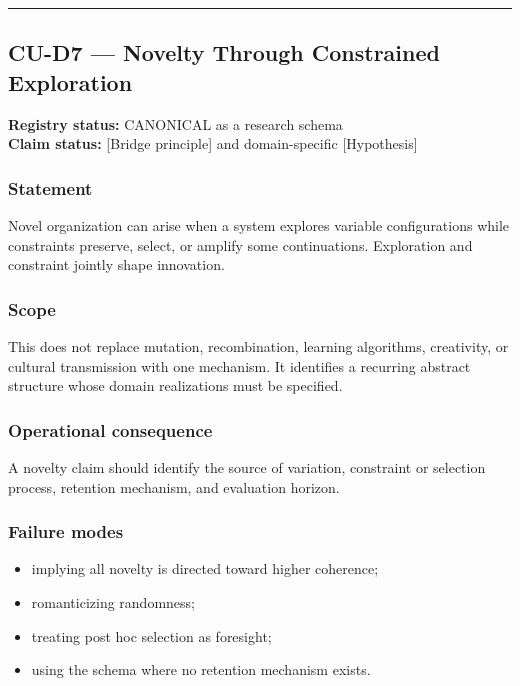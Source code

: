 \documentclass[
  11pt,
]{article}
\providecommand{\tightlist}{%
  \setlength{\itemsep}{0pt}\setlength{\parskip}{0pt}}
\begin{document}
\begin{center}\rule{0.5\linewidth}{0.5pt}\end{center}

\subsection{CU-D7 --- Novelty Through Constrained
Exploration}\label{cu-d7-novelty-through-constrained-exploration}

\textbf{Registry status:} CANONICAL as a research schema\\
\textbf{Claim status:} {[}Bridge principle{]} and domain-specific
{[}Hypothesis{]}

\subsubsection{Statement}\label{statement-47}

Novel organization can arise when a system explores variable
configurations while constraints preserve, select, or amplify some
continuations. Exploration and constraint jointly shape innovation.

\subsubsection{Scope}\label{scope-21}

This does not replace mutation, recombination, learning algorithms,
creativity, or cultural transmission with one mechanism. It identifies a
recurring abstract structure whose domain realizations must be
specified.

\subsubsection{Operational
consequence}\label{operational-consequence-29}

A novelty claim should identify the source of variation, constraint or
selection process, retention mechanism, and evaluation horizon.

\subsubsection{Failure modes}\label{failure-modes-20}

\begin{itemize}
\tightlist
\item
  implying all novelty is directed toward higher coherence;
\item
  romanticizing randomness;
\item
  treating post hoc selection as foresight;
\item
  using the schema where no retention mechanism exists.
\end{itemize}
\end{document}
